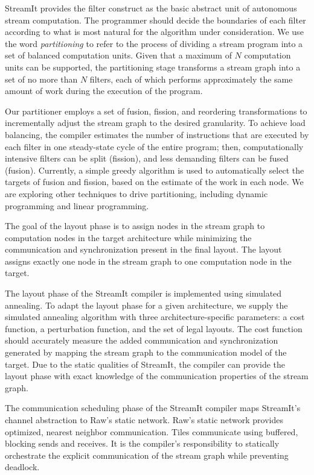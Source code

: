 StreamIt provides the filter construct as the basic abstract unit of
autonomous stream computation.  The programmer should decide the
boundaries of each filter according to what is most natural for the
algorithm under consideration. We use the word {\it partitioning}
 to refer to the process of dividing
a stream program into a set of balanced computation units.  Given that
a maximum of $N$ computation units can be supported, the partitioning
stage transforms a stream graph into a set of no more than $N$
filters, each of which performs approximately the same amount of work
during the execution of the program.

Our partitioner employs a set of fusion, fission, and reordering
transformations to incrementally adjust the stream graph to the
desired granularity.  To achieve load balancing, the compiler
estimates the number of instructions that are executed by each filter
in one steady-state cycle of the entire program; then, computationally
intensive filters can be split (fission), and less demanding filters
can be fused (fusion).  Currently, a simple greedy algorithm is used
to automatically select the targets of fusion and fission, based on
the estimate of the work in each node.  We are exploring other
techniques to drive partitioning, including dynamic programming and
linear programming.

The goal of the layout phase is to assign nodes in the stream graph to
computation nodes in the target architecture while minimizing the
communication and synchronization present in the final layout.  The
layout assigns exactly one node in the stream graph to one computation
node in the target. 

The layout phase of the StreamIt compiler is implemented using
simulated annealing.  To adapt the
layout phase for a given architecture, we supply the simulated
annealing algorithm with three architecture-specific parameters: a
cost function, a perturbation function, and the set of legal layouts.
The cost function should accurately measure the added communication
and synchronization generated by mapping the stream graph to the
communication model of the target.  Due to the static qualities of
StreamIt, the compiler can provide the layout phase with exact
knowledge of the communication properties of the stream graph.

The communication scheduling phase of the StreamIt compiler maps
StreamIt's channel abstraction to Raw's static network.
Raw's static network provides optimized,
nearest neighbor communication.  Tiles communicate using buffered,
blocking sends and receives.  It is the compiler's responsibility to
statically orchestrate the explicit communication of the stream graph
while preventing deadlock.


